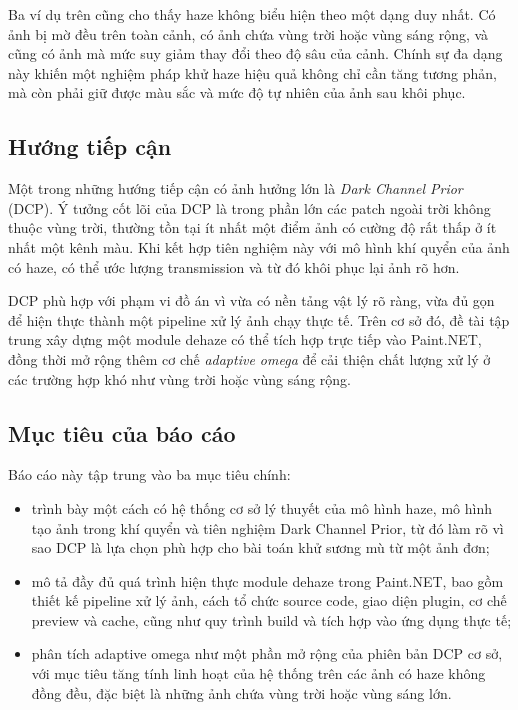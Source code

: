 Ba ví dụ trên cũng cho thấy haze không biểu hiện theo một dạng duy nhất. Có ảnh bị mờ đều trên toàn cảnh, có ảnh chứa vùng trời hoặc vùng sáng rộng, và cũng có ảnh mà mức suy giảm thay đổi theo độ sâu của cảnh. Chính sự đa dạng này khiến một nghiệm pháp khử haze hiệu quả không chỉ cần tăng tương phản, mà còn phải giữ được màu sắc và mức độ tự nhiên của ảnh sau khôi phục.

\subsection{Hướng tiếp cận}

Một trong những hướng tiếp cận có ảnh hưởng lớn là \textit{Dark Channel Prior} (DCP). Ý tưởng cốt lõi của DCP là trong phần lớn các patch ngoài trời không thuộc vùng trời, thường tồn tại ít nhất một điểm ảnh có cường độ rất thấp ở ít nhất một kênh màu. Khi kết hợp tiên nghiệm này với mô hình khí quyển của ảnh có haze, có thể ước lượng transmission và từ đó khôi phục lại ảnh rõ hơn.

DCP phù hợp với phạm vi đồ án vì vừa có nền tảng vật lý rõ ràng, vừa đủ gọn để hiện thực thành một pipeline xử lý ảnh chạy thực tế. Trên cơ sở đó, đề tài tập trung xây dựng một module dehaze có thể tích hợp trực tiếp vào Paint.NET, đồng thời mở rộng thêm cơ chế \textit{adaptive omega} để cải thiện chất lượng xử lý ở các trường hợp khó như vùng trời hoặc vùng sáng rộng.

\subsection{Mục tiêu của báo cáo}

Báo cáo này tập trung vào ba mục tiêu chính:
\begin{itemize}
\item trình bày một cách có hệ thống cơ sở lý thuyết của mô hình haze, mô hình tạo ảnh trong khí quyển và tiên nghiệm Dark Channel Prior, từ đó làm rõ vì sao DCP là lựa chọn phù hợp cho bài toán khử sương mù từ một ảnh đơn;
\item mô tả đầy đủ quá trình hiện thực module dehaze trong Paint.NET, bao gồm thiết kế pipeline xử lý ảnh, cách tổ chức source code, giao diện plugin, cơ chế preview và cache, cũng như quy trình build và tích hợp vào ứng dụng thực tế;
\item phân tích adaptive omega như một phần mở rộng của phiên bản DCP cơ sở, với mục tiêu tăng tính linh hoạt của hệ thống trên các ảnh có haze không đồng đều, đặc biệt là những ảnh chứa vùng trời hoặc vùng sáng lớn.
\end{itemize}

